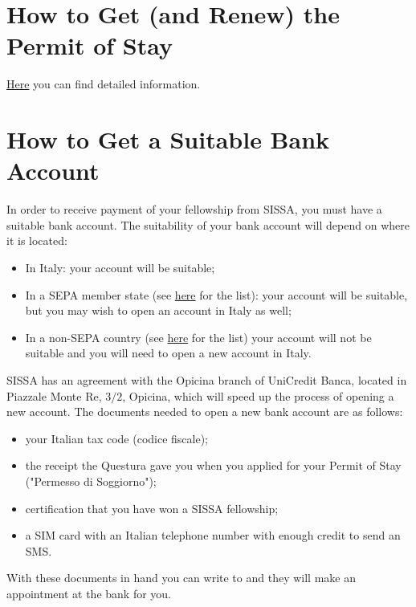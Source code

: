 \documentclass{sissavademecum}
\begin{document}
\section{How to Get (and Renew) the Permit of Stay}

\href{http://wiki.sissa.it/students/index.php/Permit_of_stay}{Here} you can find detailed information.


\section{How to Get a Suitable Bank Account}

In order to receive payment of your fellowship from SISSA, you must have a suitable bank account. The suitability of your bank account will depend on where it is located:
\begin{itemize}
    \item In Italy: your account will be suitable;
    \item In a SEPA member state (see \href{http://www.sepaitalia.eu/welcome.asp?Page=2389&chardim=0&a=a&langid=1}{here} for the list): your account will be suitable, but you may wish to open an account in Italy as well;
    \item In a non-SEPA country (see \href{http://www.sepaitalia.eu/welcome.asp?Page=2389&chardim=0&a=a&langid=1}{here} for the list) your account will not be suitable and you will need to open a new account in Italy.
\end{itemize}

SISSA has an agreement with the Opicina branch of UniCredit Banca, located in Piazzale Monte Re, $3/2$, Opicina, which will speed up the process of opening a new account. The documents needed to open a new bank account are as follows:
\begin{itemize}
    \item your Italian tax code (codice fiscale);
    \item the receipt the Questura gave you when you applied for your Permit of Stay ("Permesso di Soggiorno");
    \item certification that you have won a SISSA fellowship;
    \item a SIM card with an Italian telephone number with enough credit to send an SMS.
\end{itemize}

With these documents in hand you can write to  and they will make an appointment at the bank for you.
\end{document}
